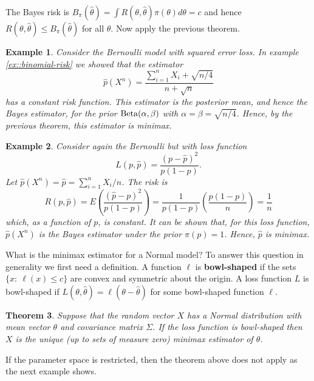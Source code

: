 \documentclass[twoside,12pt]{article}
\newcounter{lecnum}
\newtheorem{theorem}{Theorem}[lecnum]
\newtheorem{example}[theorem]{Example}
\begin{document}
\proof
The Bayes risk is
$B_\pi(\widehat{\theta}) = \int R(\theta,\widehat{\theta})  \pi(\theta)d\theta =c$
and hence
$R(\theta,\widehat{\theta}) \leq B_\pi(\widehat{\theta})$ for all $\theta$.
Now apply the previous theorem. 

\begin{example}\label{ex::binomial-minimax}
Consider the Bernoulli model with squared error loss.
In example \ref{ex::binomial-risk} we showed that the estimator 
$$
\widehat{p}(X^n) = \frac{\sum_{i=1}^nX_i + \sqrt{n/4}}{n+ \sqrt{n}}
$$
has a constant risk function.
This estimator is the posterior mean, and hence the Bayes estimator,
for the prior ${\rm Beta} (\alpha,\beta)$ with
$\alpha = \beta = \sqrt{n/4}$. Hence, by the previous theorem, 
this estimator is minimax.
\end{example}

\begin{example}
Consider again the Bernoulli 
but with loss function
$$
L(p,\widehat{p}) = \frac{ (p-\widehat{p})^2}{ p(1-p)}.
$$
Let
$\widehat{p}(X^n) = \widehat{p} =\sum_{i=1}^n X_i/n$.
The risk is
$$
R(p,\widehat{p}) =
E \left( \frac{ (\widehat{p}-p)^2}{p (1-p)}\right) =
\frac{1}{p(1-p)} \left( \frac{p(1-p)}{n}\right)=
\frac{1}{n}
$$
which, as a function of $p$, is constant.
It can be shown that,
for this loss function, $\widehat{p}(X^n)$ is the Bayes estimator
under the prior $\pi(p)=1$.
Hence, $\widehat{p}$ is minimax.
\end{example}

What is the minimax estimator for a
Normal model?
To answer this question in generality we first need a definition.
A function $\ell$ is
{\bf bowl-shaped} if
the sets $\{x:\ \ell(x) \leq c\}$
are convex and symmetric about the origin.
A loss function $L$ is bowl-shaped if
$L(\theta,\widehat\theta) = \ell(\theta-\widehat\theta)$ for some
bowl-shaped function $\ell$.

\begin{theorem}
Suppose that the random vector $X$
has a Normal distribution with mean vector
$\theta$ and covariance matrix $\Sigma$.
If the loss function is bowl-shaped then
$X$ is the unique (up to sets of measure zero)
minimax estimator of $\theta$.
\end{theorem}



If the parameter space is restricted,
then the theorem above does not apply as
the next example shows.
\end{document}
